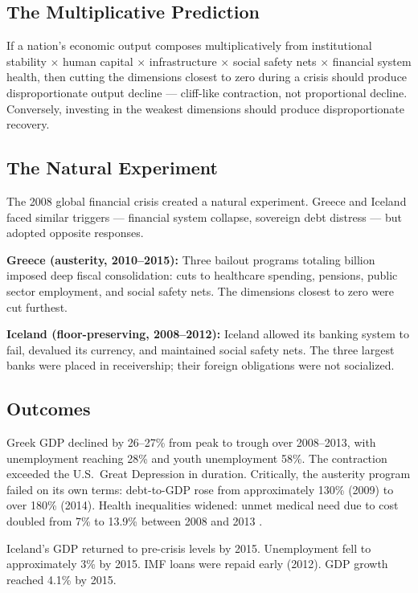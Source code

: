 \documentclass[12pt]{article}
\begin{document}
\subsection{The Multiplicative Prediction}

If a nation's economic output composes multiplicatively from institutional stability $\times$ human capital $\times$ infrastructure $\times$ social safety nets $\times$ financial system health, then cutting the dimensions closest to zero during a crisis should produce disproportionate output decline --- cliff-like contraction, not proportional decline. Conversely, investing in the weakest dimensions should produce disproportionate recovery.

\subsection{The Natural Experiment}

The 2008 global financial crisis created a natural experiment. Greece and Iceland faced similar triggers --- financial system collapse, sovereign debt distress --- but adopted opposite responses.

\textbf{Greece (austerity, 2010--2015):} Three bailout programs totaling  billion imposed deep fiscal consolidation: cuts to healthcare spending, pensions, public sector employment, and social safety nets. The dimensions closest to zero were cut furthest.

\textbf{Iceland (floor-preserving, 2008--2012):} Iceland allowed its banking system to fail, devalued its currency, and maintained social safety nets. The three largest banks were placed in receivership; their foreign obligations were not socialized.

\subsection{Outcomes}

Greek GDP declined by 26--27\% from peak to trough over 2008--2013, with unemployment reaching 28\% and youth unemployment 58\%. The contraction exceeded the U.S.\ Great Depression in duration. Critically, the austerity program failed on its own terms: debt-to-GDP rose from approximately 130\% (2009) to over 180\% (2014). Health inequalities widened: unmet medical need due to cost doubled from 7\% to 13.9\% between 2008 and 2013 \citep{economou2016health}.

Iceland's GDP returned to pre-crisis levels by 2015. Unemployment fell to approximately 3\% by 2015. IMF loans were repaid early (2012). GDP growth reached 4.1\% by 2015.
\end{document}
